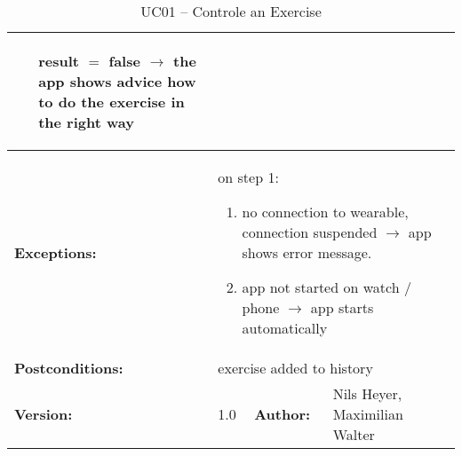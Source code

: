 \begin{table}[H]
\begin{tabular}{|l|l|l|l|l|l|}
{{\begin{itemize}[leftmargin=2.5cm]
				\item[result $=$ false] $\rightarrow$ the app shows advice how to do the exercise in the right way
			\end{itemize}
		}} \\ \hline
		\textbf{Exceptions:} & \multicolumn{5}{l|}{\parbox{0.75\textwidth}{
			$ $\\on step 1:
			\begin{enumerate}
				\item no connection to wearable, connection suspended $\rightarrow$ app shows error message.
				\item app not started on watch / phone $\rightarrow$ app starts automatically
			\end{enumerate}
		}} \\ \hline
		\textbf{Postconditions:} & \multicolumn{5}{l|}{exercise added to history} \\ \hline
		\textbf{Version:} & \multicolumn{2}{l|}{1.0} & \textbf{Author:} & \multicolumn{2}{l|}{Nils Heyer, Maximilian Walter} \\ \hline
	\end{tabular}
	\caption{UC01 -- Controle an Exercise}
	\label{cae}
\end{table}





\clearpage

